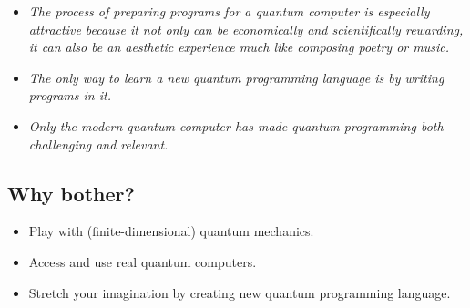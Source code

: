 \documentclass{beamer}
\begin{document}
\begin{frame}{\insertsection}{\insertsubsection}

\begin{itemize}
    \item<1-> \emph{The process of preparing programs for a quantum computer is 
    especially attractive because it not only can be economically and 
    scientifically rewarding, it can also be an aesthetic experience much like 
    composing poetry or music.}
    \item<2-> \emph{The only way to learn a new quantum programming language is 
    by writing programs in it.}
    \item<3-> \emph{Only the modern quantum computer has made quantum 
    programming both challenging and relevant.}
\end{itemize}
\end{frame}

\subsection{Why bother?}

\begin{frame}{\insertsection}{\insertsubsection}
	\begin{itemize}
        \item<1-> Play with (finite-dimensional) quantum mechanics.
        \item<2-> Access and use real quantum computers.
        \item<3-> Stretch your imagination by creating new quantum programming 
        language.
    \end{itemize}
	
\end{frame}



\end{document}
